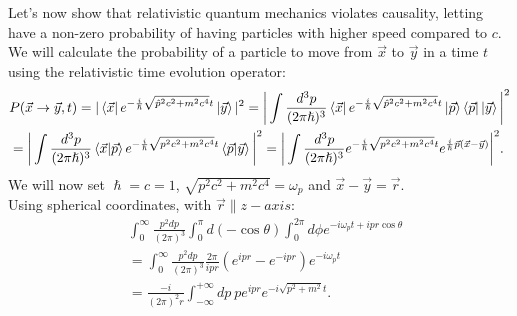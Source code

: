 Let's now show that relativistic quantum mechanics violates causality, letting have a non-zero probability of having particles with higher speed compared to $c$.\\ We will calculate the probability of a particle to move from $\vec x$ to $\vec y$ in a time $t$ using the relativistic time evolution operator:
\begin{align*}
    &P(\vec x \rightarrow\vec y,t)=|\bra{\vec x} e^{-\frac{i}{\hslash}\sqrt{\hat p^2c^2+m^2c^4}t}\ket{\vec y}|^2=\bigg|\int \frac{d^3p}{(2\pi\hslash)^3}\bra{\vec x} e^{-\frac{i}{\hslash}\sqrt{\hat p^2c^2+m^2c^4}t}\ket{\vec p}\bra{\vec p}\ket{\vec y}\bigg|^2\\
    &=\bigg|\int \frac{d^3p}{(2\pi\hslash)^3}\braket{\vec x|\vec p} e^{-\frac{i}{\hslash}\sqrt{p^2c^2+m^2c^4}t}\braket{\vec p|\vec y}\bigg|^2=\bigg|\int \frac{d^3p}{(2\pi\hslash)^3} e^{-\frac{i}{\hslash}\sqrt{p^2c^2+m^2c^4}t} e^{\frac{i}{\hslash}\vec p(\vec x-\vec y)}\bigg|^2.
\end{align*}
We will now set $\hslash=c=1$, $\sqrt{p^2c^2+m^2c^4}=\omega_p$ and $\vec x-\vec y=\vec r$.\\
Using spherical coordinates, with $\vec r\parallel z-axis$: 
\begin{align*}
    &\int_{0}^{\infty} \frac{p^2dp}{(2\pi)^3}\int_{0}^{\pi}d(-\cos\theta)\int_{0}^{2\pi}d\phi e^{-i\omega_pt+ipr\cos\theta}\\&=\int_{0}^{\infty} \frac{p^2dp}{(2\pi)^3}\frac{2\pi}{ipr}(e^{ipr}-e^{-ipr})e^{-i\omega_pt}\\&=\frac{-i}{(2\pi)^2r}\int_{-\infty}^{+\infty} dp\ pe^{ipr}e^{-i\sqrt{p^2+m^2}t}.
\end{align*} 

